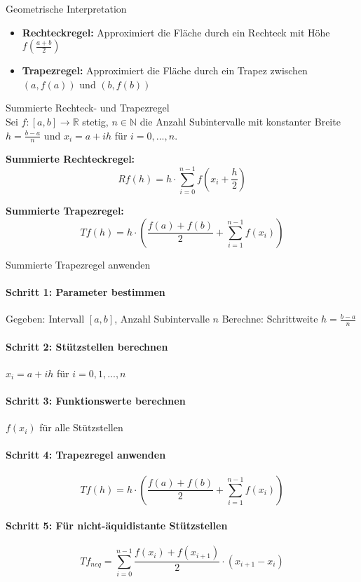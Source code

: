 \begin{concept}{Geometrische Interpretation}\\
\begin{itemize}
    \item \textbf{Rechteckregel:} Approximiert die Fläche durch ein Rechteck mit Höhe $f(\frac{a+b}{2})$
    \item \textbf{Trapezregel:} Approximiert die Fläche durch ein Trapez zwischen $(a,f(a))$ und $(b,f(b))$
\end{itemize}
\end{concept}

\begin{theorem}{Summierte Rechteck- und Trapezregel}\\
Sei $f: [a,b] \rightarrow \mathbb{R}$ stetig, $n \in \mathbb{N}$ die Anzahl Subintervalle mit konstanter Breite $h = \frac{b-a}{n}$ und $x_i = a + ih$ für $i = 0, ..., n$.

\textbf{Summierte Rechteckregel:}
$$Rf(h) = h \cdot \sum_{i=0}^{n-1} f\left(x_i + \frac{h}{2}\right)$$

\textbf{Summierte Trapezregel:}
$$Tf(h) = h \cdot \left(\frac{f(a) + f(b)}{2} + \sum_{i=1}^{n-1} f(x_i)\right)$$
\end{theorem}

\begin{KR}{Summierte Trapezregel anwenden}\\
\paragraph{Schritt 1: Parameter bestimmen}
Gegeben: Intervall $[a,b]$, Anzahl Subintervalle $n$
Berechne: Schrittweite $h = \frac{b-a}{n}$

\paragraph{Schritt 2: Stützstellen berechnen}
$x_i = a + ih$ für $i = 0, 1, ..., n$

\paragraph{Schritt 3: Funktionswerte berechnen}
$f(x_i)$ für alle Stützstellen

\paragraph{Schritt 4: Trapezregel anwenden}
$$Tf(h) = h \cdot \left(\frac{f(a) + f(b)}{2} + \sum_{i=1}^{n-1} f(x_i)\right)$$

\paragraph{Schritt 5: Für nicht-äquidistante Stützstellen}
$$Tf_{neq} = \sum_{i=0}^{n-1} \frac{f(x_i) + f(x_{i+1})}{2} \cdot (x_{i+1} - x_i)$$
\end{KR}

